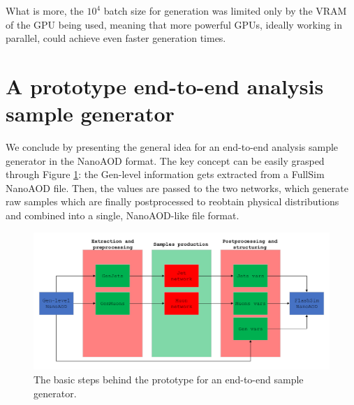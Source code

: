 What is more, the $10^{4}$ batch size for generation was limited only by the VRAM of the GPU being used, meaning that more powerful GPUs, ideally working in parallel, could achieve even faster generation times.


\section{A prototype end-to-end analysis sample generator}\label{sec:progen}

We conclude by presenting the general idea for an end-to-end analysis sample generator in the NanoAOD format. The key concept can be easily grasped through Figure \ref{fig:endtoend}: the Gen-level information gets extracted from a FullSim NanoAOD file. Then, the values are passed to the two networks, which generate raw samples which are finally postprocessed to reobtain physical distributions and combined into a single, NanoAOD-like file format.

\begin{figure}
    \centering
    \includegraphics[width=\linewidth]{gfx/ch5/endtoend.pdf}
    \caption[end-toend sample generator]{The basic steps behind the prototype for an end-to-end sample generator.}
    \label{fig:endtoend}
\end{figure}


